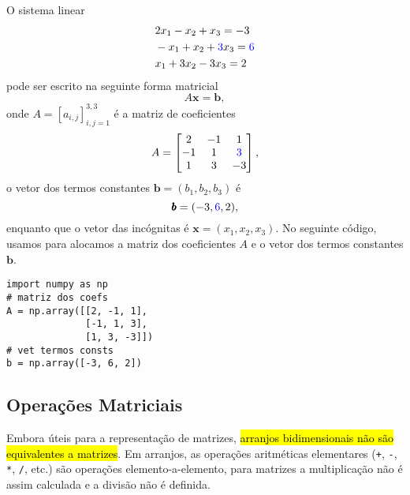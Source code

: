 \begin{ex}\label{cap_arr_sec_mat:ex:sislin}
  O sistema linear
  \begin{subequations}
    \begin{align}
      & 2x_1 - x_2 + x_3 = -3 \\
      & -x_1 + x_2 + {\color{blue}3}x_3 = {\color{blue}6} \\
      & x_1 + 3x_2 - 3x_3 = 2
    \end{align}
  \end{subequations}
  pode ser escrito na seguinte forma matricial
  \begin{equation}
    A\pmb{x} = \pmb{b},
  \end{equation}
  onde $A = [a_{i,j}]_{i,j=1}^{3,3}$ é a matriz de coeficientes
  \begin{equation}
    A =
    \begin{bmatrix}
      2 & -1 & 1\\
      -1 & 1 & {\color{blue}3}\\
      1 & 3 & -3
    \end{bmatrix},
  \end{equation}
  o vetor dos termos constantes $\pmb{b} = (b_1, b_2, b_3)$ é
  \begin{equation}
    \pmb{b} = (-3, {\color{blue}6}, 2),
  \end{equation}
  enquanto que o vetor das incógnitas é $\pmb{x} = (x_1, x_2, x_3)$. No seguinte código, usamos {\PYTHONnumpyDOTarray} para alocamos a matriz dos coeficientes $A$ e o vetor dos termos constantes $\pmb{b}$.

\begin{lstlisting}
import numpy as np
# matriz dos coefs
A = np.array([[2, -1, 1],
              [-1, 1, 3],
              [1, 3, -3]])
# vet termos consts
b = np.array([-3, 6, 2])
\end{lstlisting}

\end{ex}

\subsection{Operações Matriciais}

Embora úteis para a representação de matrizes, \hl{arranjos bidimensionais não são equivalentes a matrizes}. Em arranjos, as operações aritméticas elementares (\lstinline!+!, \lstinline!-!, \lstinline!*!, \lstinline!/!, etc.) são operações elemento-a-elemento, para matrizes a multiplicação não é assim calculada e a divisão não é definida.

